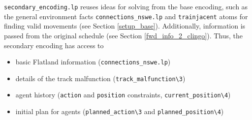 \documentclass[runningheads]{llncs}
\begin{document}
\verb|secondary_encoding.lp| reuses ideas for solving from the base encoding, such as the general environment facts \verb|connections_nswe.lp| and \verb|trainjacent| atoms for finding valid movements (see Section \ref{setup_base}). Additionally, information is passed from the original schedule (see Section \ref{fwd_info_2_clingo}). Thus, the secondary encoding has access to 
\begin{itemize}
	\item basic Flatland information (\verb|connections_nswe.lp|)
	\item details of the track malfunction (\verb|track_malfunction\3|)
	\item agent history (\verb|action| and \verb|position| constraints, \verb|current_position\4|)
	\item {initial plan for agents (\verb|planned_action\3| and \verb|planned_position\4|)}
\end{itemize}
\end{document}
